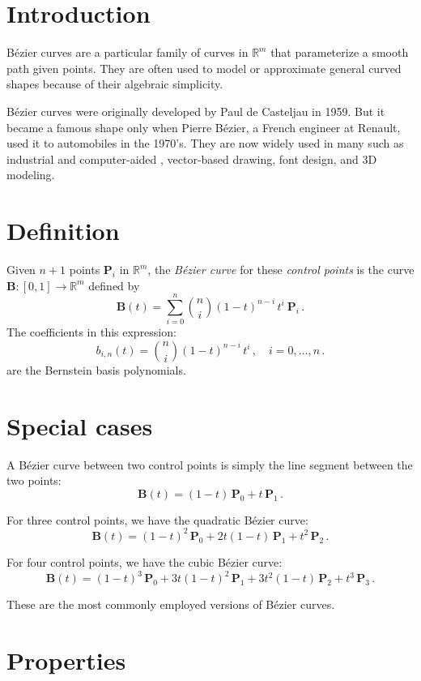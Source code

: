 \documentclass{article}
\providecommand{\PP}{\mathbf{P}}
\providecommand{\PB}{\mathbf{B}}
\begin{document}
\section{Introduction}
B\'ezier curves are a particular family of curves in $\mathbb{R}^m$
that parameterize a smooth path  given points.
They are often used to model or approximate general curved shapes 
because of their algebraic simplicity.

B\'ezier curves were originally developed by Paul de Casteljau in 1959. But it became a famous shape only when Pierre B\'ezier, a French engineer at Renault, used it to  automobiles in the 1970's. 
They are now widely used in many  such as industrial and computer-aided , 
vector-based drawing, font design, and 3D modeling.

\section{Definition}
Given $n+1$ points $\PP_i$ in $\mathbb{R}^m$,
the \emph{B\'ezier curve} for these \emph{control points} is the curve $\PB \colon [0,1] \to \mathbb{R}^m$
defined by
\[
\PB(t) = \sum_{i=0}^{n} \binom{n}{i} (1-t)^{n-i} \, t^i \: \PP_i\,.
\]
The coefficients in this expression:
\[
b_{i,n}(t) = \binom{n}{i} (1-t)^{n-i} \, t^i \,, \quad  i=0,\ldots, n\,.
\]
are the Bernstein basis polynomials.

\section{Special cases}
A B\'ezier curve between two control points is simply the line segment
between the two points:
\[
\PB(t) = (1-t) \, \PP_0  +  t \, \PP_1\,.
\]

For three control points, we have the quadratic B\'ezier curve:
\[
\PB(t) = (1-t)^2 \, \PP_0  +  2 t (1-t) \, \PP_1 +  t^2 \, \PP_2\,.
\]

For four control points, we have the cubic B\'ezier curve:
\[
\PB(t) =  (1-t)^3 \, \PP_0 +  3 t (1-t)^2 \, \PP_1 + 3 t^2 (1-t) \, \PP_2 + t^3\,  \PP_3\,.
\]

These are the most commonly employed versions of B\'ezier curves.


\section{Properties}
\end{document}

